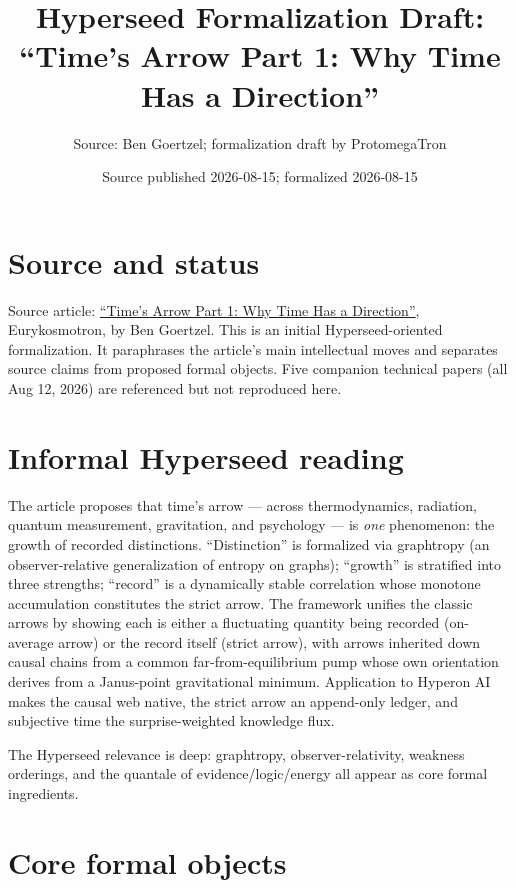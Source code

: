 \documentclass[11pt]{article}
\title{Hyperseed Formalization Draft:\\
``Time's Arrow Part 1: Why Time Has a Direction''}
\author{Source: Ben Goertzel; formalization draft by ProtomegaTron}
\date{Source published 2026-08-15; formalized 2026-08-15}
\begin{document}
\maketitle

\section{Source and status}

Source article: \href{https://bengoertzel.substack.com/p/times-arrow-part-1-why-time-has-a}{%
``Time's Arrow Part 1: Why Time Has a Direction''}, Eurykosmotron, by Ben Goertzel.
This is an initial Hyperseed-oriented formalization.  It paraphrases the
article's main intellectual moves and separates source claims from proposed
formal objects.  Five companion technical papers (all Aug 12, 2026) are
referenced but not reproduced here.

\section{Informal Hyperseed reading}

The article proposes that time's arrow — across thermodynamics, radiation,
quantum measurement, gravitation, and psychology — is \emph{one} phenomenon:
the growth of recorded distinctions.  ``Distinction'' is formalized via
graphtropy (an observer-relative generalization of entropy on graphs);
``growth'' is stratified into three strengths; ``record'' is a dynamically
stable correlation whose monotone accumulation constitutes the strict arrow.
The framework unifies the classic arrows by showing each is either a
fluctuating quantity being recorded (on-average arrow) or the record itself
(strict arrow), with arrows inherited down causal chains from a common
far-from-equilibrium pump whose own orientation derives from a Janus-point
gravitational minimum.  Application to Hyperon AI makes the causal web
native, the strict arrow an append-only ledger, and subjective time the
surprise-weighted knowledge flux.

The Hyperseed relevance is deep: graphtropy, observer-relativity, weakness
orderings, and the quantale of evidence/logic/energy all appear as core
formal ingredients.

\section{Core formal objects}
\end{document}
